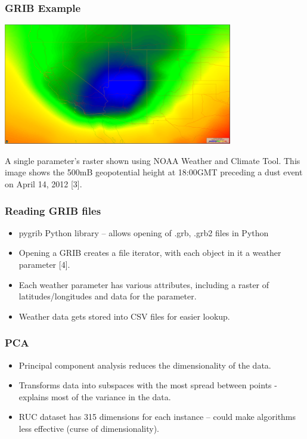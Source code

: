 \documentclass{beamer}
\begin{document}
\begin{frame}
	\frametitle{GRIB Example}
	\centering
	\includegraphics[width=0.75\textwidth]{images/abqlow.png}

	A single parameter's raster shown using NOAA Weather and Climate Tool. This image shows the 500mB geopotential height at 18:00GMT preceding a dust event on April 14, 2012 [3].


\end{frame}
\begin{frame}
	\frametitle{Reading GRIB files}
	\begin{itemize}
		\item
			pygrib Python library -- allows opening of .grb, .grb2 files in Python
		\item
			Opening a GRIB creates a file iterator, with each object in it a weather parameter [4].
		\item
			Each weather parameter has various attributes, including a raster of latitudes/longitudes and data for the parameter.
		\item
			Weather data gets stored into CSV files for easier lookup.
	\end{itemize}

\end{frame}
\begin{frame}
	\frametitle{PCA}
	\begin{itemize}
		\item
			Principal component analysis reduces the dimensionality of the data.
		\item 
			Transforms data into subspaces with the most spread between points - explains most of the variance in the data.
		\item
			RUC dataset has 315 dimensions for each instance -- could make algorithms less effective (curse of dimensionality).


	\end{itemize}

\end{frame}
\end{document}
